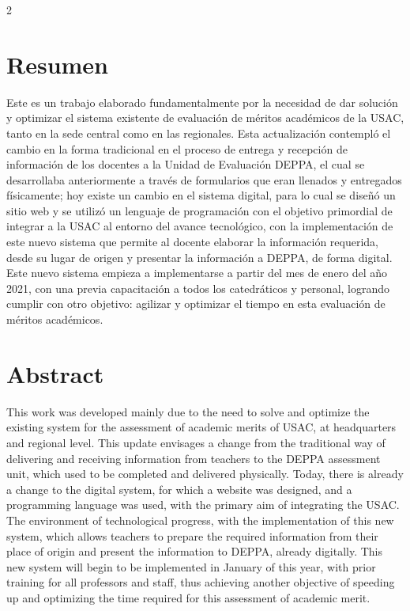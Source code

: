 \documentclass[12pt,spanish,Letterpaper,openany]{book}
\begin{document}
\begin {multicols}{2}

\hypertarget{resumen-10}{%
\section{Resumen}\label{resumen-10}}

Este es un trabajo elaborado fundamentalmente por la necesidad de dar solución y optimizar el sistema existente de evaluación de méritos académicos de la USAC, tanto en la sede central como en las regionales. Esta actualización contempló el cambio en la forma tradicional en el proceso de entrega y recepción de información de los docentes a la Unidad de Evaluación DEPPA, el cual se desarrollaba anteriormente a través de formularios que eran llenados y entregados físicamente; hoy existe un cambio en el sistema digital, para lo cual se diseñó un sitio web y se utilizó un lenguaje de programación con el objetivo primordial de integrar a la USAC al entorno del avance tecnológico, con la implementación de este nuevo sistema que permite al docente elaborar la información requerida, desde su lugar de origen y presentar la información a DEPPA, de forma digital. Este nuevo sistema empieza a implementarse a partir del mes de enero del año 2021, con una previa capacitación a todos los catedráticos y personal, logrando cumplir con otro objetivo: agilizar y optimizar el tiempo en esta evaluación de méritos académicos.

\hypertarget{abstract-8}{%
\section{Abstract}\label{abstract-8}}

This work was developed mainly due to the need to solve and optimize the existing system for the assessment of academic merits of USAC, at headquarters and regional level. This update envisages a change from the traditional way of delivering and receiving information from teachers to the DEPPA assessment unit, which used to be completed and delivered physically. Today, there is already a change to the digital system, for which a website was designed, and a programming language was used, with the primary aim of integrating the USAC. The environment of technological progress, with the implementation of this new system, which allows teachers to prepare the required information from their place of origin and present the information to DEPPA, already digitally. This new system will begin to be implemented in January of this year, with prior training for all professors and staff, thus achieving another objective of speeding up and optimizing the time required for this assessment of academic merit.


\end{multicols}
\end{document}
